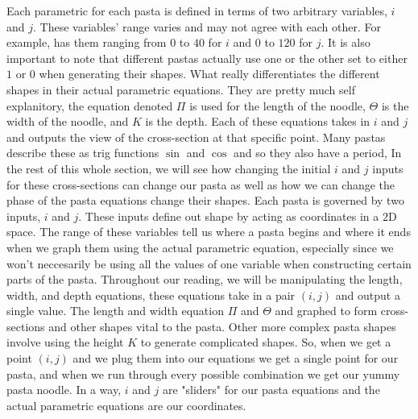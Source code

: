 \markdownRendererDocumentBegin
{}\markdownRendererSectionBegin
\markdownRendererSectionBegin
{}\markdownRendererInterblockSeparator
{}Each parametric for each pasta is defined in terms of two arbitrary variables, $i$ and $j$. These variables' range varies and may not agree with each other. For example,  has them ranging from $0$ to $40$ for $i$ and $0$ to $120$ for $j$. It is also important to note that different pastas actually use one or the other set to either $1$ or $0$ when generating their shapes.\markdownRendererParagraphSeparator
{}What really differentiates the different shapes in their actual parametric equations. They are pretty much self explanitory, the equation denoted $\Pi$ is used for the length of the noodle, $\Theta$ is the width of the noodle, and $K$ is the depth. Each of these equations takes in $i$ and $j$ and outputs the view of the cross-section at that specific point. Many pastas describe these as trig functions $\sin$ and $\cos$ and so they also have a period,\markdownRendererParagraphSeparator
{}In the rest of this whole section, we will see how changing the initial $i$ and $j$ inputs for these cross-sections can change our pasta as well as how we can change the phase of the pasta equations change their shapes.\markdownRendererInterblockSeparator
{}
\markdownRendererSectionEnd \markdownRendererSectionBegin
{}\markdownRendererInterblockSeparator
{}Each pasta is governed by two inputs, $i$ and $j$. These inputs define out shape by acting as coordinates in a $2\text{D}$ space. The range of these variables tell us where a pasta begins and where it ends when we graph them using the actual parametric equation, especially since we won't neccesarily be using all the values of one variable when constructing certain parts of the pasta. Throughout our reading, we will be manipulating the length, width, and depth equations, these equations take in a pair $(i,j)$ and output a single value. The length and width equation $\Pi$ and $\Theta$ and graphed to form cross-sections and other shapes vital to the pasta. Other more complex pasta shapes involve using the height $K$ to generate complicated shapes. So, when we get a point $(i,j)$ and we plug them into our equations we get a single point for our pasta, and when we run through every possible combination we get our yummy pasta noodle. In a way, $i$ and $j$ are "sliders" for our pasta equations and the actual parametric equations are our coordinates.\markdownRendererInterblockSeparator
